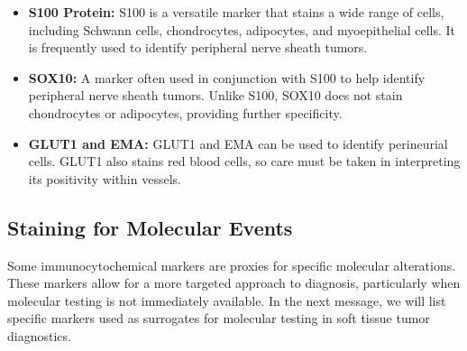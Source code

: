 \begin{itemize}
    \item \textbf{S100 Protein:} S100 is a versatile marker that stains a wide range of cells, including Schwann cells, chondrocytes, adipocytes, and myoepithelial cells. It is frequently used to identify peripheral nerve sheath tumors.
    \item \textbf{SOX10:} A marker often used in conjunction with S100 to help identify peripheral nerve sheath tumors. Unlike S100, SOX10 does not stain chondrocytes or adipocytes, providing further specificity.
    \item \textbf{GLUT1 and EMA:} GLUT1 and EMA can be used to identify perineurial cells. GLUT1 also stains red blood cells, so care must be taken in interpreting its positivity within vessels.
\end{itemize}

\subsection{Staining for Molecular Events}
Some immunocytochemical markers are proxies for specific molecular alterations. These markers allow for a more targeted approach to diagnosis, particularly when molecular testing is not immediately available. In the next message, we will list specific markers used as surrogates for molecular testing in soft tissue tumor diagnostics.


